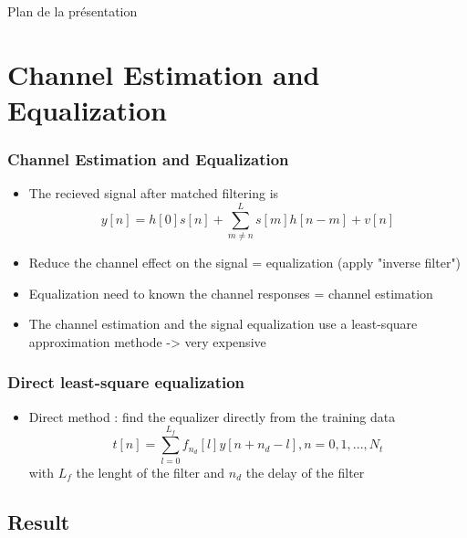 \documentclass[11pt]{beamer}
\begin{document}
{
	\begin{frame}[noframenumbering]{Plan de la présentation}
		\tableofcontents
	\end{frame}
}

\section{Channel Estimation and Equalization}
\begin{frame}
\frametitle{Channel Estimation and Equalization}
\begin{itemize}
\item The recieved signal after matched filtering is
\begin{equation}
y[n] = h[0]s[n] + \sum_{m \neq n}^{L}{s[m]h[n-m]} + v[n]
\end{equation}
\item Reduce the channel effect on the signal = equalization (apply "inverse filter")
\item Equalization need to known the channel responses = channel estimation
\item The channel estimation and the signal equalization use a least-square approximation methode -> very expensive
\end{itemize}
\end{frame}

\begin{frame}
\frametitle{Direct least-square equalization}
\begin{itemize}
\item Direct method : find the equalizer directly from the training data
\begin{equation}
t[n] = \sum_{l=0}^{L_f}{f_{n_d}[l]y[n+n_d-l]}, n = 0,1,...,N_t
\end{equation}
with $L_f$ the lenght of the filter and $n_d$ the delay of the filter

\end{itemize}
\end{frame}
\subsection{Result}
\end{document}
